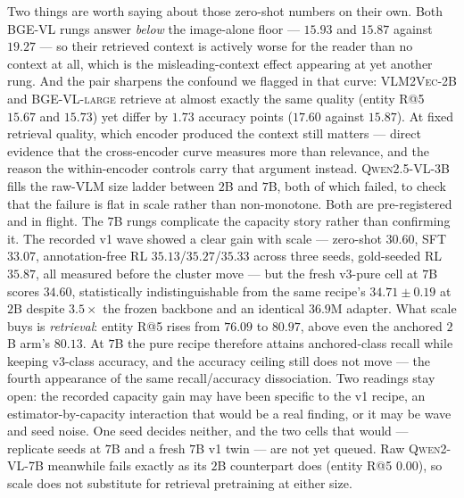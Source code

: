 Two things are worth saying about those zero-shot numbers on their own. Both \textsc{BGE-VL} rungs
answer \emph{below} the image-alone floor --- $15.93$ and $15.87$ against $19.27$ --- so their
retrieved context is actively worse for the reader than no context at all, which is the
misleading-context effect appearing at yet another rung. And the pair sharpens the confound we
flagged in that curve: \textsc{VLM2Vec-2B} and \textsc{BGE-VL-large} retrieve at almost exactly
the same quality (entity R@5 $15.67$ and $15.73$) yet differ by $1.73$ accuracy points
($17.60$ against $15.87$). At fixed retrieval quality, which encoder produced the context still
matters --- direct evidence that the cross-encoder curve measures more than relevance, and the
reason the within-encoder controls carry that argument instead. \textsc{Qwen2.5-VL-3B} fills the raw-VLM size ladder between $2$B
and $7$B, both of which failed, to check that the failure is flat in scale rather than
non-monotone. Both are pre-registered and in flight. The $7$B rungs complicate the capacity story rather than confirming it. The recorded v1 wave
showed a clear gain with scale --- zero-shot $30.60$, SFT $33.07$, annotation-free RL
$35.13$/$35.27$/$35.33$ across three seeds, gold-seeded RL $35.87$, all measured before the
cluster move --- but the fresh v3-pure cell at $7$B scores $34.60$, statistically
indistinguishable from the same recipe's $34.71 \pm 0.19$ at $2$B despite $3.5\times$ the frozen
backbone and an identical $36.9$M adapter. What scale buys is \emph{retrieval}: entity R@5 rises
from $76.09$ to $80.97$, above even the anchored $2$B arm's $80.13$. At $7$B the pure recipe
therefore attains anchored-class recall while keeping v3-class accuracy, and the accuracy ceiling
still does not move --- the fourth appearance of the same recall/accuracy dissociation. Two
readings stay open: the recorded capacity gain may have been specific to the v1 recipe, an
estimator-by-capacity interaction that would be a real finding, or it may be wave and seed noise.
One seed decides neither, and the two cells that would --- replicate seeds at $7$B and a fresh
$7$B v1 twin --- are not yet queued. Raw \textsc{Qwen2-VL-7B} meanwhile fails exactly as its $2$B
counterpart does (entity R@5 $0.00$), so scale does not substitute for retrieval pretraining at
either size.

